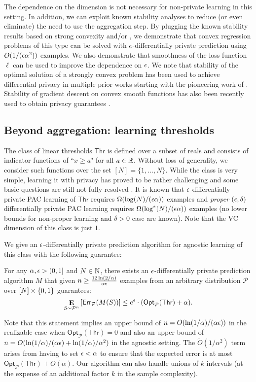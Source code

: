 \documentclass[final,12pt]{colt2018}
\providecommand{\err}{\mathsf{Err}}
\providecommand{\opt}{\mathsf{Opt}}
\providecommand{\cP}{{\mathcal P}}
\newcommand{\Thr}{\mathsf{Thr}}
\begin{document}
The dependence on the dimension is not necessary for non-private learning in this setting. In addition, we can exploit known stability analyses to reduce (or even eliminate) the need to use the aggregation step. By plugging the known stability results based on strong convexity and/or \cite{BousquettE02,ShwartzSSS10,HardtRS16}, we demonstrate that convex regression problems of this type can be solved with $\epsilon$-differentially private prediction using $O(1/(\epsilon\alpha^2))$ examples. We also demonstrate that smoothness of the loss function $\ell$ can be used to improve the dependence on $\epsilon$.
We note that stability of the optimal solution of a strongly convex problem has been used to achieve differential privacy in multiple prior works starting with the pioneering work of \citet{ChaudhuriMS11}. Stability of gradient descent on convex smooth functions has also been recently used to obtain privacy guarantees \citep{WuLKCJN17}.


\subsection{Beyond aggregation: learning thresholds}
The class of linear thresholds $\Thr$ is defined over a subset of reals and consists of  indicator functions of ``$x \geq a$" for all $a \in {\mathbb R}$. Without loss of generality, we consider such functions over the set $[N]=\{1,\ldots,N\}$.  While the class is very simple, learning it with privacy has proved to be rather challenging and some basic questions are still not fully resolved  \citep{BeimelKN:10,ChaudhuriHsu:11,BeimelNS:13,FeldmanXiao15,BunNSV15}. It is known that $\epsilon$-differentially private PAC learning of $\Thr$  requires $\Omega(\log(N)/(\epsilon\alpha))$ examples \citep{FeldmanXiao15} and {\em proper} $(\epsilon,\delta)$ differentially private PAC learning requires $\Omega(\log^*(N)/(\epsilon\alpha))$ examples \citep{BunNSV15} (no lower bounds for non-proper learning and $\delta>0$ case are known). Note that the VC dimension of this class is just $1$.

We give an $\epsilon$-differentially private prediction algorithm for agnostic learning of this class with the following guarantee:
\begin{thm}
\label{thm:thr-intro}
For any $\alpha,\epsilon > (0,1]$ and $N\in {\mathbb N}$, there exists an $\epsilon$-differentially private prediction algorithm $M$ that given $n \geq \frac{12 \ln(2/\alpha)}{\alpha \epsilon}$ examples from an arbitrary distribution $\cP$ over $[N]\times \{0,1\}$ guarantees:
$$\E_{S \sim \cP^n}\lb \err_\cP(M(S)) \rb  \leq e^\eps \cdot (\opt_\cP(\Thr) + \alpha) .$$
\end{thm}
Note that this statement implies an upper bound of $n=O(\ln(1/\alpha)/(\alpha\epsilon))$ in the realizable case when $\opt_\cP(\Thr) = 0$ and also an upper bound of $n=O(\ln(1/\alpha)/(\alpha\epsilon) + \ln(1/\alpha)/\alpha^2)$ in the agnostic setting. The $\tilde O(1/\alpha^2)$ term arises from having to set $\epsilon < \alpha$ to ensure that the expected error is at most $\opt_\cP(\Thr) + O(\alpha)$.
Our algorithm can also handle unions of $k$ intervals (at the expense of an additional factor $k$ in the sample complexity).
\end{document}
